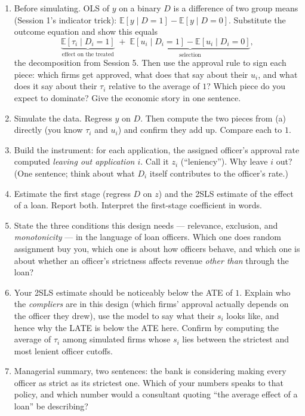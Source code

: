 \documentclass[11pt]{article}
\newcommand{\E}{\mathbb{E}}
\begin{document}
\begin{enumerate}[label=(\alph*)]
\item Before simulating. OLS of $y$ on a binary $D$ is a difference of two group means
(Session 1's indicator trick): $\E[y \mid D=1] - \E[y \mid D=0]$. Substitute the outcome
equation and show this equals
\[
\underbrace{\E[\tau_{i} \mid D_{i}=1]}_{\text{effect on the treated}}
\;+\;
\underbrace{\E[u_{i} \mid D_{i}=1] - \E[u_{i} \mid D_{i}=0]}_{\text{selection}},
\]
the decomposition from Session 5. Then use the approval rule to sign each piece: which firms
get approved, what does that say about their $u_{i}$, and what does it say about their
$\tau_{i}$ relative to the average of $1$? Which piece do you expect to dominate? Give the
economic story in one sentence.
\item Simulate the data. Regress $y$ on $D$. Then compute the two pieces from (a) directly
(you know $\tau_{i}$ and $u_{i}$) and confirm they add up. Compare each to $1$.
\item Build the instrument: for each application, the assigned officer's approval rate
computed \emph{leaving out application $i$}. Call it $z_{i}$ (``leniency''). Why leave $i$
out? (One sentence; think about what $D_{i}$ itself contributes to the officer's rate.)
\item Estimate the first stage (regress $D$ on $z$) and the 2SLS estimate of the effect of a
loan. Report both. Interpret the first-stage coefficient in words.
\item State the three conditions this design needs --- relevance, exclusion, and
\emph{monotonicity} --- in the language of loan officers. Which one does random assignment
buy you, which one is about how officers behave, and which one is about whether an officer's
strictness affects revenue \emph{other than} through the loan?
\item Your 2SLS estimate should be noticeably below the ATE of $1$. Explain who the
\emph{compliers} are in this design (which firms' approval actually depends on the officer they
drew), use the model to say what their $s_{i}$ looks like, and hence why the LATE is below the
ATE here. Confirm by computing the average of $\tau_{i}$ among simulated firms whose $s_{i}$
lies between the strictest and most lenient officer cutoffs.
\item Managerial summary, two sentences: the bank is considering making every officer
as strict as its strictest one. Which of your numbers speaks to that policy, and which
number would a consultant quoting ``the average effect of a loan'' be describing?
\end{enumerate}
\end{document}
